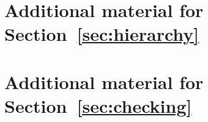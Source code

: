 \documentclass[acmsmall,review,anonymous,screen]{acmart}\settopmatter{printfolios=true,printccs=false,printacmref=true}
\begin{document}
\section{Additional material for Section~\ref{sec:hierarchy}}
\label{apx:hierarchy}


\section{Additional material for Section~\ref{sec:checking}}
\label{apx:checking}



\fi

\ifcomments


% 
%
\fi
\end{document}
